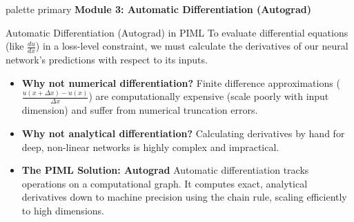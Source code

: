\documentclass[9pt]{beamer}
\begin{document}
\begin{frame}[plain]
  \vfill
  \centering
  \begin{beamercolorbox}[sep=8pt,center,shadow=true,rounded=true]{palette primary}
    \textbf{Module 3: Automatic Differentiation (Autograd)}
  \end{beamercolorbox}
  \vfill
\end{frame}

\begin{frame}{Automatic Differentiation (Autograd) in PIML}
  To evaluate differential equations (like $\frac{du}{dx}$) in a loss-level constraint, we must calculate the derivatives of our neural network's predictions with respect to its inputs.
  \begin{itemize}
    \item \textbf{Why not numerical differentiation?}
      Finite difference approximations ($\frac{u(x+\Delta x) - u(x)}{\Delta x}$) are computationally expensive (scale poorly with input dimension) and suffer from numerical truncation errors.
    \item \textbf{Why not analytical differentiation?}
      Calculating derivatives by hand for deep, non-linear networks is highly complex and impractical.
    \item \textbf{The PIML Solution: Autograd}
      Automatic differentiation tracks operations on a computational graph. It computes exact, analytical derivatives down to machine precision using the chain rule, scaling efficiently to high dimensions.
  \end{itemize}
\end{frame}
\end{document}
